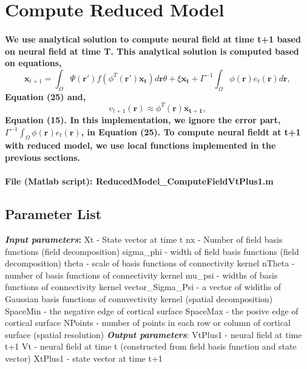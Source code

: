 \documentclass[a4paper, 12pt, english]{article}
\begin{document}
\section{Compute Reduced Model}

\paragraph{We use analytical solution to compute neural field at time t+1 based on
neural field at time T.\newline
This analytical solution is computed based on equations,
$$\boldsymbol{x}_{t+1}=\int_{\Omega}\Psi(\boldsymbol{r}\prime)f(\phi^{T}(\boldsymbol{r\prime})\boldsymbol{x_t})d\boldsymbol{r}\theta + \xi\boldsymbol{x_t} + \Gamma^{-1}\int_{\Omega}\phi(\boldsymbol{r})e_t(\boldsymbol{r})d\boldsymbol{r},$$
Equation (25) and,
$$v_{t+1}(\boldsymbol{r})\approx\phi^T(\boldsymbol{r})\boldsymbol{x_{t+1}}, $$
Equation (15).\newline
In this implementation, we ignore the error part, $\Gamma^{-1}\int_{\Omega}\phi(\boldsymbol{r})e_t(\boldsymbol{r})$, in Equation (25).\newline
To compute neural fieldt at t+1 with reduced model, we use local functions implemented in the previous sections.
}

\paragraph{File (Matlab script): ReducedModel\_ComputeFieldVtPlus1.m}

\subsection{Parameter List}
\textbf{\textit{Input parameters}:}\newline
Xt - State vector at time t\newline
nx - Number of field basis functions (field decomposition)\newline
sigma\_phi - width of field basis functions (field decomposition)\newline
theta - scale of basis functions of connectivity kernel\newline
nTheta - number of basis functions of connectivity kernel\newline
mu\_psi - widths of basis functions of connectivity kernel\newline
vector\_Sigma\_Psi - a vector of widiths of Gaussian basis functions of
connvectivity kernel (spatial decomposition)\newline
SpaceMin - the negative edge of cortical surface\newline
SpaceMax - the posive edge of cortical surface\newline
NPoints - number of points in each row or column of cortical
surface (spatial resolution)\newline
\textbf{\textit{Output parameters}}:\newline
VtPlus1 - neural field at time t+1\newline
Vt - neural field at time t
(constructed from field basis function and state vector)\newline
XtPlus1 - state vector at time t+1\newline
\end{document}
